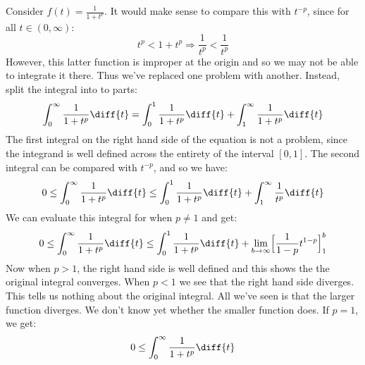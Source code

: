         \begin{lexample}
            Consider $f(t)=\frac{1}{1+t^{p}}$. It would make sense
            to compare this with $t^{\minus{p}}$, since for all
            $t\in(0,\infty)$:
            \begin{equation}
                t^{p}<1+t^{p}\Rightarrow
                \frac{1}{t^{p}}<\frac{1}{t^{p}}
            \end{equation}
            However, this latter function is improper at the origin
            and so we may not be able to integrate it there. Thus
            we've replaced one problem with another. Instead, split
            the integral into to parts:
            \begin{equation}
                \int_{0}^{\infty}\frac{1}{1+t^{p}}\diff{t}=
                \int_{0}^{1}\frac{1}{1+t^{p}}\diff{t}+
                \int_{1}^{\infty}\frac{1}{1+t^{p}}\diff{t}
            \end{equation}
            The first integral on the right hand side of the equation
            is not a problem, since the integrand is well defined
            across the entirety of the interval $[0,1]$. The
            second integral can be compared with $t^{\minus{p}}$,
            and so we have:
            \begin{equation}
                0\leq\int_{0}^{\infty}\frac{1}{1+t^{p}}\diff{t}
                \leq\int_{0}^{1}\frac{1}{1+t^{p}}\diff{t}+
                \int_{1}^{\infty}\frac{1}{t^{p}}\diff{t}
            \end{equation}
            We can evaluate this integral for when $p\ne{1}$ and
            get:
            \begin{equation}
                0\leq\int_{0}^{\infty}\frac{1}{1+t^{p}}\diff{t}
                \leq\int_{0}^{1}\frac{1}{1+t^{p}}\diff{t}+
                \underset{b\rightarrow\infty}{\lim}
                \Big[\frac{1}{1-p}t^{1-p}\Big]_{1}^{b}
            \end{equation}
            Now when $p>1$, the right hand side is well defined
            and this shows the the original integral converges.
            When $p<1$ we see that the right hand side diverges.
            This tells us nothing about the original integral. All
            we've seen is that the larger function diverges. We don't
            know yet whether the smaller function does. If $p=1$,
            we get:
            \begin{equation}
                0\leq\int_{0}^{\infty}\frac{1}{1+t^{p}}\diff{t}

\end{equation}
\end{lexample}
